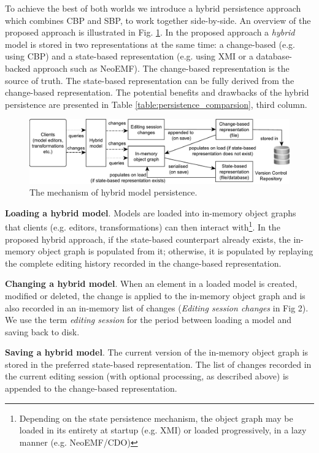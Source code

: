 \documentclass[sigplan,review,anonymous]{acmart}\settopmatter{printfolios=true,printccs=false,printacmref=false}
\begin{document}
To achieve the best of both worlds we introduce a hybrid persistence approach which combines CBP and SBP, to work together side-by-side. An overview of the proposed approach is illustrated in Fig. \ref{fig:hybrid_persistence}. In the proposed approach a \textit{hybrid} model is stored in two representations at the same time: a change-based (e.g. using CBP) and a state-based representation (e.g. using XMI or a database-backed approach such as NeoEMF). The change-based representation is the source of truth. The state-based representation can be fully derived from the change-based representation. The potential benefits and drawbacks of the hybrid persistence are presented in Table \ref{table:persistence_comparsion}, third column.

\begin{figure}[ht]
    \includegraphics[width=\linewidth]{images/hybrid_persistence}
    \caption{The mechanism of hybrid model persistence.}
    \label{fig:hybrid_persistence}
\end{figure}

\textbf{Loading a hybrid model}. Models are loaded into in-memory object graphs that clients (e.g. editors, transformations) can then interact with\footnote{Depending on the state persistence mechanism, the object graph may be loaded in its entirety at startup (e.g. XMI) or loaded progressively, in a lazy manner (e.g. NeoEMF/CDO)}. In the proposed hybrid approach, if the state-based counterpart already exists, the in-memory object graph is populated from it; otherwise, it is populated by replaying the complete editing history recorded in the change-based representation.

\textbf{Changing a hybrid model}. When an element in a loaded model is created, modified or deleted, the change is applied to the in-memory object graph and is also recorded in an in-memory list of changes (\textit{Editing session changes} in Fig 2). We use the term \emph{editing session} for the period between loading a model and saving back to disk. 

\textbf{Saving a hybrid model}. The current version of the in-memory object graph is stored in the preferred state-based representation. The list of changes recorded in the current editing session (with optional processing, as described above) is appended to the change-based representation.
\end{document}
